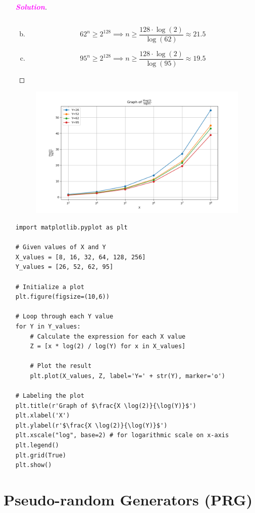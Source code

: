 \documentclass[12pt,openany]{book}
\theoremstyle{definition}
\newcommand{\sol}{\textcolor{magenta}{\bf Solution}}
\begin{document}
\begin{itemize}
\begin{proof}[\sol]
\begin{enumerate}[(a)]
\[					\]
					\item \[
					62^n\geq 2^{128}\implies n\geq\frac{128\cdot\log(2)}{\log(62)}\approx 21.5
					\]
					\item \[
					95^n\geq 2^{128}\implies n\geq\frac{128\cdot\log(2)}{\log(95)}\approx 19.5
					\]
				\end{enumerate}
			\end{proof}
		\begin{figure}[h!]
			\centering
			\includegraphics[scale=.75]{4_12.png}
		\end{figure}
		\begin{lstlisting}[style=sage]
import matplotlib.pyplot as plt

# Given values of X and Y
X_values = [8, 16, 32, 64, 128, 256]
Y_values = [26, 52, 62, 95]

# Initialize a plot
plt.figure(figsize=(10,6))

# Loop through each Y value
for Y in Y_values:
	# Calculate the expression for each X value
	Z = [x * log(2) / log(Y) for x in X_values]
	
	# Plot the result
	plt.plot(X_values, Z, label='Y=' + str(Y), marker='o')

# Labeling the plot
plt.title(r'Graph of $\frac{X \log(2)}{\log(Y)}$')
plt.xlabel('X')
plt.ylabel(r'$\frac{X \log(2)}{\log(Y)}$')
plt.xscale("log", base=2) # for logarithmic scale on x-axis
plt.legend()
plt.grid(True)
plt.show()
\end{lstlisting}
	\end{itemize}

	\newpage
	\chapter{Pseudo-random Generators (PRG)}
	
\end{document}
